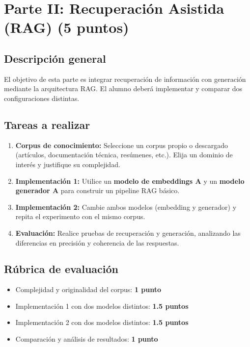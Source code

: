 \documentclass[a4paper]{article}
\begin{document}
\section{Parte II: Recuperación Asistida (RAG) (5 puntos)}

\subsection*{Descripción general}
El objetivo de esta parte es integrar recuperación de información con generación mediante la arquitectura RAG. El alumno deberá implementar y comparar dos configuraciones distintas.

\subsection*{Tareas a realizar}
\begin{enumerate}
    \item \textbf{Corpus de conocimiento:}  
    Seleccione un corpus propio o descargado (artículos, documentación técnica, resúmenes, etc.).  
    Elija un dominio de interés y justifique su complejidad.
    
    \item \textbf{Implementación 1:}  
    Utilice un \textbf{modelo de embeddings A}  
    y un \textbf{modelo generador A} para construir un pipeline RAG básico.
    
    \item \textbf{Implementación 2:}  
    Cambie ambos modelos (embedding y generador) y repita el experimento con el mismo corpus.
    
    \item \textbf{Evaluación:}  
    Realice pruebas de recuperación y generación, analizando las diferencias en precisión y coherencia de las respuestas.
\end{enumerate}

\subsection*{Rúbrica de evaluación}
\begin{itemize}
    \item Complejidad y originalidad del corpus: \textbf{1 punto}
    \item Implementación 1 con dos modelos distintos: \textbf{1.5 puntos}
    \item Implementación 2 con dos modelos distintos: \textbf{1.5 puntos}
    \item Comparación y análisis de resultados: \textbf{1 punto}
\end{itemize}
\end{document}
